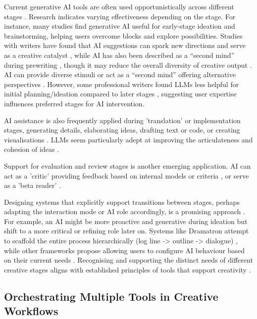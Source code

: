 Current generative AI tools are often used opportunistically across different stages \citep{Li2024-yh}. Research indicates varying effectiveness depending on the stage. For instance, many studies find generative AI useful for early-stage ideation and brainstorming, helping users overcome blocks and explore possibilities. Studies with writers have found that AI suggestions can spark new directions and serve as a creative catalyst \citep{Calderwood2020-gg, Clark2018-yf, Mirowski2023-oz}, while AI has also been described as a ``second mind'' during prewriting \citep{Wan2023-he}, though it may reduce the overall diversity of creative output \citep{Doshi2023-dv}. AI can provide diverse stimuli \citep{Haase2023-mz} or act as a ``second mind'' offering alternative perspectives \citep{Wan2023-he}. However, some professional writers found LLMs less helpful for initial planning/ideation compared to later stages \citep{Chakrabarty2024-ov}, suggesting user expertise influences preferred stages for AI intervention.

AI assistance is also frequently applied during 'translation' or implementation stages, generating details, elaborating ideas, drafting text or code, or creating visualisations \citep{Chakrabarty2024-ov, Yuan2022-kb, Lee2024-vz, Palani2024-on}. LLMs seem particularly adept at improving the articulateness and cohesion of ideas \citep{Lee2024-vz}.

Support for evaluation and review stages is another emerging application. AI can act as a 'critic' providing feedback based on internal models or criteria \citep{Lin2023-zq, Zhou2024-vp}, or serve as a 'beta reader' \citep{Ippolito2022-mf, Chakrabarty2024-ov}. 

Designing systems that explicitly support transitions between stages, perhaps adapting the interaction mode or AI role accordingly, is a promising approach \citep{Wan2023-he, Ding2024-ta}. For example, an AI might be more proactive and generative during ideation but shift to a more critical or refining role later on. Systems like Dramatron attempt to scaffold the entire process hierarchically (log line -> outline -> dialogue) \citep{Mirowski2023-oz}, while other frameworks propose allowing users to configure AI behaviour based on their current needs \citep{Moruzzi2024-cq}. Recognising and supporting the distinct needs of different creative stages aligns with established principles of tools that support creativity \citep{Resnick2005-fs, Weisz2024-io}.

\subsection{Orchestrating Multiple Tools in Creative Workflows}

